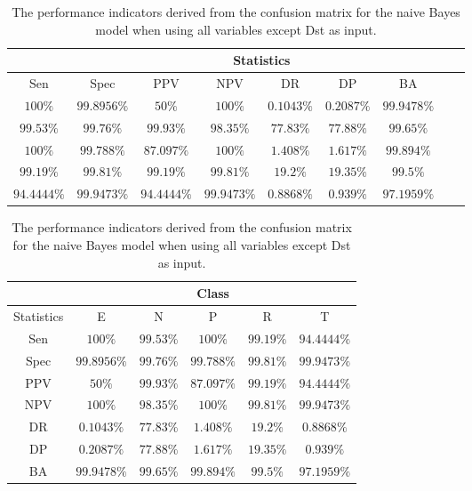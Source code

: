 \begin{table}[!ht]
	\centering
	\begin{tabular}{|c|c|c|c|c|c|c|c|c|}
		\hline
		 & \multicolumn{7}{c|}{Statistics} \\ \hline
		Sen & Spec & PPV & NPV & DR & DP & BA \\ \hline
		$100\%$ & $99.8956\%$ & $50\%$ & $100\%$ & $0.1043\%$ & $0.2087\%$ & $99.9478\%$ \\ \hline
		$99.53\%$ & $99.76\%$ & $99.93\%$ & $98.35\%$ & $77.83\%$ & $77.88\%$ & $99.65\%$ \\ \hline
		$100\%$ & $99.788\%$ & $87.097\%$ & $100\%$ & $1.408\%$ & $1.617\%$ & $99.894\%$ \\ \hline
		$99.19\%$ & $99.81\%$ & $99.19\%$ & $99.81\%$ & $19.2\%$ & $19.35\%$ & $99.5\%$ \\ \hline
		$94.4444\%$ & $99.9473\%$ & $94.4444\%$ & $99.9473\%$ & $0.8868\%$ & $0.939\%$ & $97.1959\%$ \\ \hline
	\end{tabular}
	\caption{The performance indicators derived from the confusion matrix for the naive Bayes model when using all variables except Dst as input.}
	\label{tab:cs:noDst:nb}
\end{table}

\begin{table}[!ht]
	\centering
	\begin{tabular}{|c|c|c|c|c|c|}
		\hline
		 & \multicolumn{5}{c|}{Class} \\ \hline
		Statistics & E & N & P & R & T \\ \hline
		Sen & $100\%$ & $99.53\%$ & $100\%$ & $99.19\%$ & $94.4444\%$ \\ \hline
		Spec & $99.8956\%$ & $99.76\%$ & $99.788\%$ & $99.81\%$ & $99.9473\%$ \\ \hline
		PPV & $50\%$ & $99.93\%$ & $87.097\%$ & $99.19\%$ & $94.4444\%$ \\ \hline
		NPV & $100\%$ & $98.35\%$ & $100\%$ & $99.81\%$ & $99.9473\%$ \\ \hline
		DR & $0.1043\%$ & $77.83\%$ & $1.408\%$ & $19.2\%$ & $0.8868\%$ \\ \hline
		DP & $0.2087\%$ & $77.88\%$ & $1.617\%$ & $19.35\%$ & $0.939\%$ \\ \hline
		BA & $99.9478\%$ & $99.65\%$ & $99.894\%$ & $99.5\%$ & $97.1959\%$ \\ \hline
	\end{tabular}
	\caption{The performance indicators derived from the confusion matrix for the naive Bayes model when using all variables except Dst as input.}
	\label{tab:cs:reverse:noDst:nb}
\end{table}

